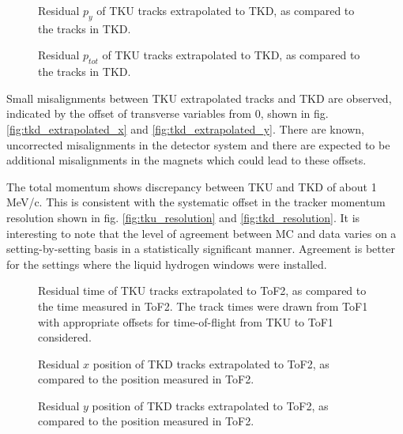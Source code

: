 \begin{figure}[!tbh]
    \centering
    {Residual $p_y$ of TKU tracks extrapolated to TKD, as compared to the tracks in TKD. \label{fig:tkd_extrapolated_py}}
\end{figure}

\begin{figure}[!tbh]
    \centering
    {Residual $p_{tot}$ of TKU tracks extrapolated to TKD, as compared to the tracks in TKD. \label{fig:tkd_extrapolated_p}}
\end{figure}

Small misalignments between TKU extrapolated tracks and TKD are observed, 
indicated by the offset of transverse variables from 0, shown in 
fig. \ref{fig:tkd_extrapolated_x} and \ref{fig:tkd_extrapolated_y}. There are known, 
uncorrected misalignments in the detector system and there are expected to be 
additional misalignments in the magnets which could lead to these offsets.

The total momentum shows discrepancy between TKU and TKD of about 1 MeV/c. This
is consistent with the systematic offset in the tracker momentum resolution 
shown in fig. \ref{fig:tku_resolution} and \ref{fig:tkd_resolution}. It is
interesting to note that the level of agreement between MC and data varies
on a setting-by-setting basis in a statistically significant manner. Agreement
is better for the settings where the liquid hydrogen windows were installed.

\begin{figure}[!tbh]
    \centering
    {Residual time of TKU tracks extrapolated to ToF2, as compared to the time measured in ToF2. The track times were
    drawn from ToF1 with appropriate offsets for time-of-flight from TKU to ToF1 considered. \label{fig:tof2_extrapolated_t}}
\end{figure}

\begin{figure}[!tbh]
    \centering
    {Residual $x$ position of TKD tracks extrapolated to ToF2, as compared to the position measured in ToF2. \label{fig:tof2_extrapolated_x}}
\end{figure}

\begin{figure}[!tbh]
    \centering
    {Residual $y$ position of TKD tracks extrapolated to ToF2, as compared to the position measured in ToF2. \label{fig:tof2_extrapolated_y}}
\end{figure}

